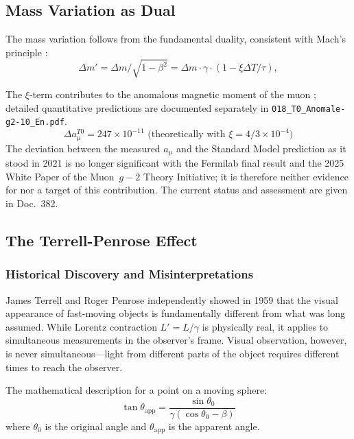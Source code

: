 	\subsection{Mass Variation as Dual}
	The mass variation follows from the fundamental duality, consistent with Mach's principle \cite{mach1883, sciama1953}:
	\begin{equation}
		\Delta m' = \Delta m / \sqrt{1 - \beta^2} = \Delta m \cdot \gamma \cdot (1 - \xi \Delta T / \tau),
	\end{equation}
	
	The $\xi$-term contributes to the anomalous magnetic moment of the muon \cite{muong2_2023, pascher2025g2}; detailed quantitative predictions are documented separately in \texttt{018\_T0\_Anomale-g2-10\_En.pdf}.
	\begin{equation}
		\Delta a_\mu^{T0} = 247 \times 10^{-11} \text{ (theoretically with } \xi = 4/3 \times 10^{-4})
	\end{equation}
	The deviation between the measured $a_\mu$ and the Standard Model prediction as it stood in 2021 is no longer significant with the Fermilab final result and the 2025 White Paper of the Muon~$g-2$ Theory Initiative; it is therefore neither evidence for nor a target of this contribution. The current status and assessment are given in Doc.~382.
	
	\subsection{The Terrell-Penrose Effect}
	
	\subsubsection{Historical Discovery and Misinterpretations}
	
	James Terrell \cite{terrell1959} and Roger Penrose \cite{penrose1959} independently showed in 1959 that the visual appearance of fast-moving objects is fundamentally different from what was long assumed. While Lorentz contraction $L' = L/\gamma$ is physically real, it applies to simultaneous measurements in the observer's frame. Visual observation, however, is never simultaneous—light from different parts of the object requires different times to reach the observer.
	
	The mathematical description for a point on a moving sphere:
	\begin{equation}
		\tan\theta_{\text{app}} = \frac{\sin\theta_0}{\gamma(\cos\theta_0 - \beta)}
	\end{equation}
	where $\theta_0$ is the original angle and $\theta_{\text{app}}$ is the apparent angle.
	
